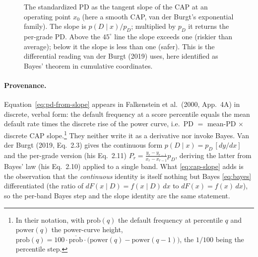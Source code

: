 \documentclass[12pt]{article}
\newcommand{\pD}{p_D}
\newcommand{\PDx}{p(D \mid x)}
\begin{document}
\begin{figure}[htbp]
\centering
{}
\caption{The standardized PD as the tangent slope of the CAP at an operating point $x_0$
(here a smooth CAP, van der Burgt's exponential family). The slope is $\PDx/\pD$; multiplied by
$\pD$ it returns the per-grade PD. Above the $45^\circ$ line the slope exceeds one (riskier than
average); below it the slope is less than one (safer). This is the differential reading van der
Burgt (2019) uses, here identified as Bayes' theorem in cumulative coordinates.}
\label{fig:tangent}
\end{figure}

\paragraph{Provenance.} Equation~\eqref{eq:pd-from-slope} appears in Falkenstein et al.\ (2000,
App.~4A) in discrete, verbal form: the default frequency at a score percentile equals the mean
default rate times the discrete rise of the power curve, i.e.\ PD $=$ mean-PD $\times$ discrete
CAP slope.\footnote{In their notation, with $\mathrm{prob}(q)$ the default frequency at
percentile $q$ and $\mathrm{power}(q)$ the power-curve height,
$\mathrm{prob}(q)=100\cdot\overline{\mathrm{prob}}\cdot\big(\mathrm{power}(q)-\mathrm{power}(q-1)\big)$,
the $1/100$ being the percentile step.} They neither write it as a derivative nor invoke Bayes. Van der Burgt (2019, Eq.~2.3) gives the
continuous form $\PDx=\pD\,[dy/dx]$ and the per-grade version (his Eq.~2.11)
$P_r=\frac{y_r-y_{r-1}}{x_r-x_{r-1}}\pD$, deriving the latter from Bayes' law (his Eq.~2.10)
applied to a single band. What \eqref{eq:cap-slope} adds is the observation that the \emph{continuous}
identity is itself nothing but Bayes \eqref{eq:bayes} differentiated (the ratio of
$dF(x\mid D)=f(x\mid D)\,dx$ to $dF(x)=f(x)\,dx$), so the per-band Bayes step and the
slope identity are the same statement.
\end{document}
